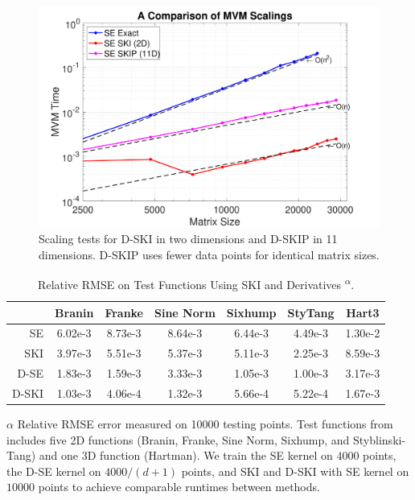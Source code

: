 \begin{figure}[ht]
  \begin{center}
    \includegraphics[width=\textwidth]{./sgp/pics/mvmScaling}
    \caption{Scaling tests for D\hyp{}SKI in two dimensions and D\hyp{}SKIP in
    11 dimensions. D\hyp{}SKIP uses fewer data points for identical matrix
    sizes.}\label{fig:scalingmvm}
  \end{center}
\end{figure}

\begin{table}[ht]
  \centering
  \caption{Relative RMSE on Test Functions Using SKI and Derivatives
  \textsuperscript{$\alpha$}.}\label{fig:testfncSKI}
  \begin{threeparttable}
    \begin{tabular}{r c c c c c c}
      \toprule 
      & Branin & Franke & Sine Norm & Sixhump & StyTang & Hart3 \\ \midrule
      SE & 6.02e-3 & 8.73e-3 & 8.64e-3 & 6.44e-3 & 4.49e-3 & 1.30e-2 \\
      SKI & 3.97e-3 & 5.51e-3 & 5.37e-3 & 5.11e-3 & 2.25e-3 & 8.59e-3 \\
      D-SE & 1.83e-3 & 1.59e-3 & 3.33e-3 & 1.05e-3 & 1.00e-3 & 3.17e-3 \\
      D-SKI & 1.03e-3 & 4.06e-4 & 1.32e-3 & 5.66e-4 & 5.22e-4 & 1.67e-3 \\ 
      \bottomrule
    \end{tabular}
    \begin{tablenotes}
      \item[$\alpha$]Relative RMSE error measured on 10000 testing points. Test
      functions from~\cite{sfutest2013} includes five 2D functions (Branin,
      Franke, Sine Norm, Sixhump, and Styblinski\hyp{}Tang) and one 3D function 
      (Hartman). We train the SE kernel on $4000$ points, the D-SE kernel on
      $4000/(d+1)$ points, and SKI and D-SKI with SE kernel on $10000$ points to
      achieve comparable runtimes between methods.
    \end{tablenotes}
  \end{threeparttable}
\end{table}

